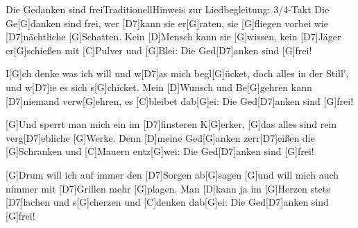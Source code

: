 \documentclass[../main.tex]{subfiles}
\begin{document}
\begin{song}{Die Gedanken sind frei}{Traditionell}{Hinweis zur Liedbegleitung: 3/4-Takt}
Die Ge[G]danken sind frei, wer [D7]kann sie er[G]raten,
sie [G]fliegen vorbei wie [D7]nächtliche [G]Schatten.
Kein [D]Mensch kann sie [G]wissen, kein [D7]Jäger er[G]schießen
mit [C]Pulver und [G]Blei: Die Ged[D7]anken sind [G]frei!

I[G]ch denke was ich will und w[D7]as mich begl[G]{ü}cket,
doch alles in der Still', und w[D7]ie es sich s[G]chicket.
Mein [D]Wunsch und Be[G]gehren kann [D7]niemand verw[G]ehren,
es [C]bleibet dab[G]ei: Die Ged[D7]anken sind [G]frei!

[G]Und sperrt man mich ein im [D7]finsteren K[G]erker,
[G]das alles sind rein verg[D7]ebliche [G]Werke.
Denn [D]meine Ged[G]anken zerr[D7]eißen die [G]Schranken
und [C]Mauern entz[G]wei: Die Ged[D7]anken sind [G]frei!

[G]Drum will ich auf immer den [D7]Sorgen ab[G]sagen
[G]und will mich auch nimmer mit [D7]Grillen mehr [G]plagen.
Man [D]kann ja im [G]Herzen stets [D7]lachen und s[G]cherzen
und [C]denken dab[G]ei: Die Ged[D7]anken sind [G]frei!
\end{song}
\end{document}
